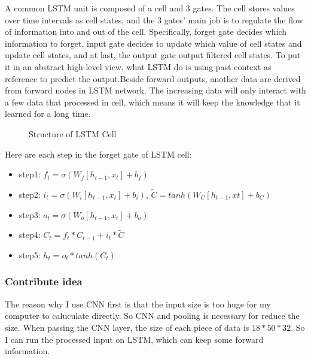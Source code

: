 \documentclass{article}
\begin{document}
A common LSTM unit is composed of a cell and 3 gates. The cell stores values over time intervals as cell states, and the 3 gates’ main job is to regulate the flow of information into and out of the cell. Specifically, forget gate decides which information to forget, input gate decides to update which value of cell states and update cell states, and at last, the output gate output filtered cell states. To put it in an abstract high-level view, what LSTM do is using past context as reference to predict the output.Beside forward outputs, another data are derived from forward nodes in LSTM network. The increasing data will only interact with a few data that processed in cell, which means it will keep the knowledge that it learned for a long time.

\begin{figure}[h]
  \centering
  \caption{Structure of LSTM Cell}
\end{figure} 


Here are each step in the forget gate of LSTM cell:
\begin{itemize}
\item step1: $f_t = \sigma(W_f[h_{t-1}, x_t] + b_f)$
\item step2: $i_t = \sigma(W_i[h_{t-1}, x_t] + b_i)$,  $\widetilde{C} = tanh(W_C[h_{t-1}, xt] + b_C)$
\item step3: $o_t=\sigma(W_o[h_{t-1}, x_t] + b_o)$
\item step4: $C_t = f_t*C_{t-1} + i_t*\widetilde{C}$
\item step5: $h_t=o_t*tanh(C_t)$
\end{itemize}

\subsubsection{Contribute idea}
The reason why I use CNN first is that the input size is too huge for my computer to caluculate directly. So CNN and pooling is necessary for reduce the size. When passing the CNN layer, the size of each piece of data is $18*50*32$. So I can run the processed input on LSTM, which can keep some forward information.
\end{document}
